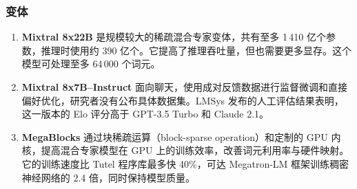 \subsubsection{变体}
\begin{enumerate}
\item \textbf{Mixtral 8x22B} 是规模较大的稀疏混合专家变体，共有至多 1\,410 亿个参数，推理时使用约 390 亿个。它提高了推理吞吐量，但也需要更多显存。这个模型可处理至多 64\,000 个词元。
\item \textbf{Mixtral 8x7B--Instruct} 面向聊天，使用成对反馈数据进行监督微调和直接偏好优化，研究者没有公布具体数据集。LMSys 发布的人工评估结果表明，这一版本的 Elo 评分高于 GPT-3.5 Turbo 和 Claude 2.1。
\item \textbf{MegaBlocks} 通过块稀疏运算（block-sparse operation）和定制的 GPU 内核，提高混合专家模型在 GPU 上的训练效率，改善词元利用率与硬件映射。它的训练速度比 Tutel 程序库最多快 40\%，可达 Megatron-LM 框架训练稠密神经网络的 2.4 倍，同时保持模型质量。
\end{enumerate}

